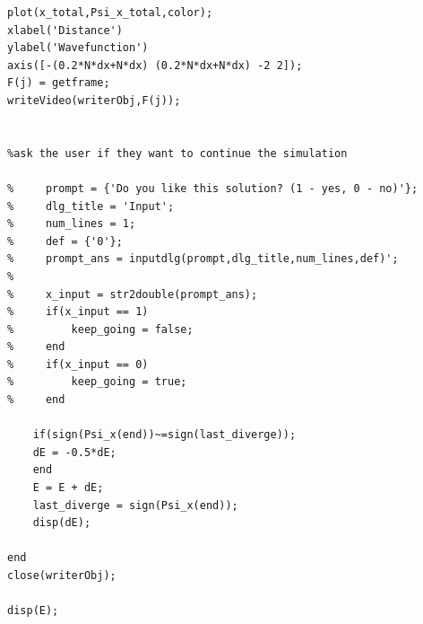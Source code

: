 \documentclass[12pt]{article}                  %
\begin{document}
\begin{verbatim}
plot(x_total,Psi_x_total,color);
xlabel('Distance')
ylabel('Wavefunction')
axis([-(0.2*N*dx+N*dx) (0.2*N*dx+N*dx) -2 2]);
F(j) = getframe;
writeVideo(writerObj,F(j));


%ask the user if they want to continue the simulation

%     prompt = {'Do you like this solution? (1 - yes, 0 - no)'};
%     dlg_title = 'Input';
%     num_lines = 1;
%     def = {'0'};
%     prompt_ans = inputdlg(prompt,dlg_title,num_lines,def)';
%     
%     x_input = str2double(prompt_ans);
%     if(x_input == 1)
%         keep_going = false;
%     end
%     if(x_input == 0)
%         keep_going = true;
%     end

    if(sign(Psi_x(end))~=sign(last_diverge));
    dE = -0.5*dE; 
    end
    E = E + dE;
    last_diverge = sign(Psi_x(end));
    disp(dE);
    
end
close(writerObj);

disp(E);

\end{verbatim}
\end{document}
